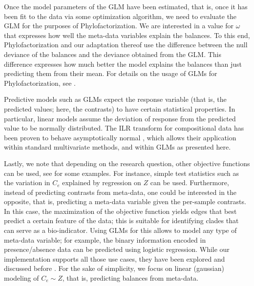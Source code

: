 Once the model parameters of the \ac{GLM} have been estimated,
that is, once it has been fit to the data via some optimization algorithm,
we need to evaluate the \ac{GLM} for the purposes of Phylofactorization.
We are interested in a value for $\omega$ that expresses how well the meta-data variables explain the balances.
To this end, Phylofactorization and our adaptation thereof use the difference between the null deviance of the balances
and the deviance obtained from the \ac{GLM}.
This difference %
expresses how much better the model explains the balances than just predicting them from their mean.
For details on the usage of \acp{GLM} for Phylofactorization, see \cite{Washburne2017a}.



Predictive models such as \acp{GLM} expect the response variable (that is, the predicted values; here, the contrasts)
to have certain statistical properties.
In particular, linear models assume the deviation of response from the predicted value to be normally distributed.
The ILR transform for compositional data has been proven to behave asymptotically normal \cite{Egozcue2003,Pawlowsky-Glahn2011a},
which allows their application within standard multivariate methods,
and within \acp{GLM} as presented here.

Lastly, we note that depending on the research question, other objective functions can be used,
see \cite{Washburne2017a,Washburne2018} for some examples.
For instance, simple test statistics such as the variation in $C_e$ explained by regression on $Z$ can be used.
Furthermore, instead of predicting contrasts from meta-data, one could be interested in the opposite,
that is, predicting a meta-data variable given the per-sample contrasts.
In this case, the maximization of the objective function yields edges that best predict a certain feature of the data;
this is suitable for identifying clades that can serve as a bio-indicator.
Using \acp{GLM} for this allows to model any type of meta-data variable;
for example, the binary information encoded in presence/absence data can be predicted using logistic regression.
While our implementation supports all those use cases,
they have been explored and discussed before \cite{Washburne2017a,Washburne2019}.
For the sake of simplicity, we focus on linear (gaussian) modeling of $C_e \sim Z$,
that is, predicting balances from meta-data.

